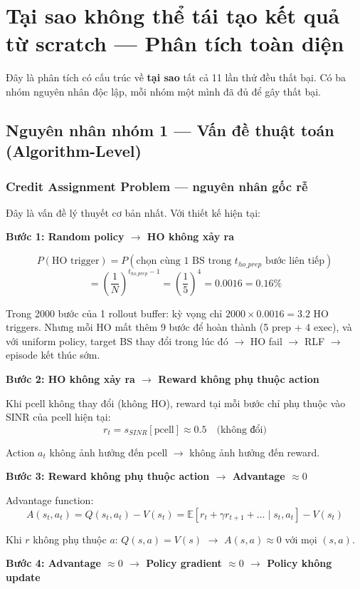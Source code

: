 \documentclass[11pt]{article}
\begin{document}
\section{Tại sao không thể tái tạo kết quả từ scratch --- Phân tích toàn diện}

Đây là phân tích có cấu trúc về \textbf{tại sao} tất cả 11 lần thử đều thất bại. Có ba nhóm nguyên nhân độc lập, mỗi nhóm một mình đã đủ để gây thất bại.

\subsection{Nguyên nhân nhóm 1 --- Vấn đề thuật toán (Algorithm-Level)}

\subsubsection{Credit Assignment Problem --- nguyên nhân gốc rễ}

Đây là vấn đề lý thuyết cơ bản nhất. Với thiết kế hiện tại:

\textbf{Bước 1: Random policy $\to$ HO không xảy ra}

\[
P(\text{HO trigger}) = P(\text{chọn cùng 1 BS trong } t_{ho\_prep} \text{ bước liên tiếp})
\]
\[
= \left(\frac{1}{N}\right)^{t_{ho\_prep} - 1} = \left(\frac{1}{5}\right)^4 = 0.0016 = 0.16\%
\]

Trong 2000 bước của 1 rollout buffer: kỳ vọng chỉ $2000 \times 0.0016 = 3.2$ HO triggers. Nhưng mỗi HO mất thêm 9 bước để hoàn thành (5 prep + 4 exec), và với uniform policy, target BS thay đổi trong lúc đó $\to$ HO fail $\to$ RLF $\to$ episode kết thúc sớm.

\textbf{Bước 2: HO không xảy ra $\to$ Reward không phụ thuộc action}

Khi pcell không thay đổi (không HO), reward tại mỗi bước chỉ phụ thuộc vào SINR của pcell hiện tại:
\[
r_t = s_{SINR}[\text{pcell}] \approx 0.5 \quad \text{(không đổi)}
\]

Action $a_t$ không ảnh hưởng đến pcell $\to$ không ảnh hưởng đến reward.

\textbf{Bước 3: Reward không phụ thuộc action $\to$ Advantage $\approx 0$}

Advantage function:
\[
A(s_t, a_t) = Q(s_t, a_t) - V(s_t) = \mathbb{E}[r_t + \gamma r_{t+1} + \ldots \mid s_t, a_t] - V(s_t)
\]

Khi $r$ không phụ thuộc $a$: $Q(s, a) = V(s)$ $\to$ $A(s, a) \approx 0$ với mọi $(s, a)$.

\textbf{Bước 4: Advantage $\approx 0$ $\to$ Policy gradient $\approx 0$ $\to$ Policy không update}
\end{document}
